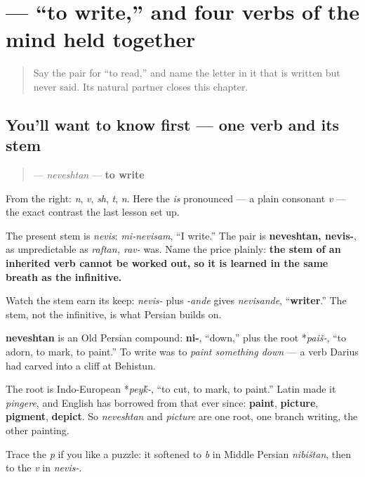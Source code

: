 \section[\texorpdfstring{\fa{نوشتن} (neveshtan)}{نوشتن (neveshtan)}]{ — “to write,” and four verbs of the mind held together}

\label{lesson:FA-C07-neveshtan}



\begin{quote}
Say the pair for “to read,” and name the letter in it that is written but never said. Its natural partner closes this chapter.
\end{quote}

\subsection*{You'll want to know first — one verb and its stem}
\begin{quote}
\textbf{} — \emph{neveshtan} — \textbf{to write}
\end{quote}

From the right: \textbf{} \emph{n}, \textbf{} \emph{v}, \textbf{} \emph{sh}, \textbf{} \emph{t}, \textbf{} \emph{n}. Here the \textbf{} \emph{is} pronounced — a plain consonant \emph{v} — the exact contrast the last lesson set up.

The present stem is \emph{nevis}: \emph{mi-nevisam}, “I write.” The pair is \textbf{neveshtan, nevis-}, as unpredictable as \emph{raftan, rav-} was. Name the price plainly: \textbf{the stem of an inherited verb cannot be worked out, so it is learned in the same breath as the infinitive.}

Watch the stem earn its keep: \emph{nevis-} plus \emph{-ande} gives \emph{nevisande}, “\textbf{writer}.” The stem, not the infinitive, is what Persian builds on.

\begin{cousinweb}
\textbf{neveshtan} is an Old Persian compound: \textbf{ni-}, “down,” plus the root *\emph{paiš-}, “to adorn, to mark, to paint.” To write was to \emph{paint something down} — a verb Darius had carved into a cliff at Behistun.

The root is Indo-European *\emph{pey\'{k}-}, “to cut, to mark, to paint.” Latin made it \emph{pingere}, and English has borrowed from that ever since: \textbf{paint}, \textbf{picture}, \textbf{pigment}, \textbf{depict}. So \emph{neveshtan} and \emph{picture} are one root, one branch writing, the other painting.

Trace the \emph{p} if you like a puzzle: it softened to \emph{b} in Middle Persian \emph{nibištan}, then to the \emph{v} in \emph{nevis-}.
\end{cousinweb}

